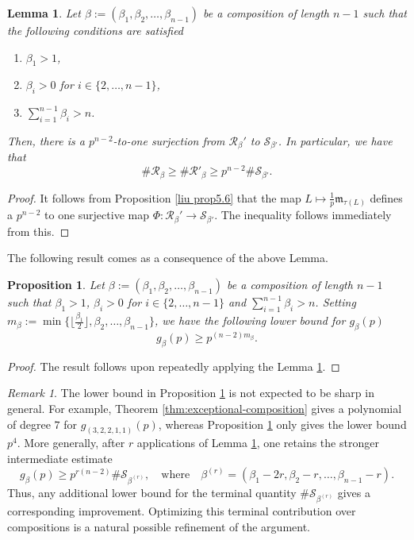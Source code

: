 \documentclass[a4paper]{amsart}
\newtheorem{lemma}[theorem]{Lemma}
\newtheorem{proposition}[theorem]{Proposition}
\numberwithin{equation}{section}
\theoremstyle{remark}
\newtheorem{remark}[theorem]{Remark}
\begin{document}
\begin{lemma}\label{7.2}
Let $\beta := (\beta_1,\beta_2,\dots,\beta_{n-1})$ be a composition of length $n-1$ such that the following conditions are satisfied
\begin{enumerate}
    \item $\beta_1 > 1$, 
    \item $\beta_i > 0$ for $i \in \{2,\dots,n-1\}$,
    \item $\sum_{i=1}^{n-1}\beta_i > n$.
\end{enumerate} Then, there is a $p^{n-2}$-to-one surjection from $\mathcal{R}_{\beta}'$ to $\mathcal{S}_{\beta'}$. In particular, we have that
\[\#\mathcal{R}_{\beta} \geq \#\mathcal{R}'_{\beta}\geq p^{n-2}\#\mathcal{S}_{\beta'}.\]
\end{lemma}
\begin{proof}
It follows from Proposition \ref{liu prop5.6} that the map $L \mapsto \frac{1}{p}\mathfrak{m}_{\tau(L)}$ defines a $p^{n-2}$ to one surjective map $\Phi:\mathcal{R}_\beta'\rightarrow \mathcal{S}_{\beta'}$. The inequality follows immediately from this. 
\end{proof}
The following result comes as a consequence of the above Lemma. 
\begin{proposition}\label{prop 7.3}
Let $\beta := (\beta_1,\beta_2,\dots,\beta_{n-1})$ be a composition of length $n-1$ such that $\beta_1 > 1$, $\beta_i > 0$ for $i \in \{2,\dots,n-1\}$ and $\sum_{i=1}^{n-1}\beta_i > n$. Setting $m_\beta := \min\{\lfloor \frac{\beta_1}{2}\rfloor,\beta_2,\dots,\beta_{n-1}\}$, we have the following lower bound for $g_\beta(p)$
\[g_{\beta}(p) \geq p^{(n-2)m_\beta}.\]
\end{proposition}
\begin{proof}
   The result follows upon repeatedly applying the Lemma \ref{7.2}.
\end{proof}
\begin{remark}
The lower bound in Proposition \ref{prop 7.3} is not expected to be sharp in general. For example, Theorem \ref{thm:exceptional-composition} gives a polynomial of degree $7$ for $g_{(3,2,2,1,1)}(p)$, whereas Proposition \ref{prop 7.3} only gives the lower bound $p^4$. More generally, after $r$ applications of Lemma \ref{7.2}, one retains the stronger intermediate estimate
\[g_\beta(p)\geq p^{r(n-2)}\#\mathcal S_{\beta^{(r)}},\quad\text{where}\quad \beta^{(r)}=(\beta_1-2r,\beta_2-r,\dots,\beta_{n-1}-r).\]
Thus, any additional lower bound for the terminal quantity $\#\mathcal S_{\beta^{(r)}}$ gives a corresponding improvement. Optimizing this terminal contribution over compositions is a natural possible refinement of the argument.
\end{remark}
\end{document}
